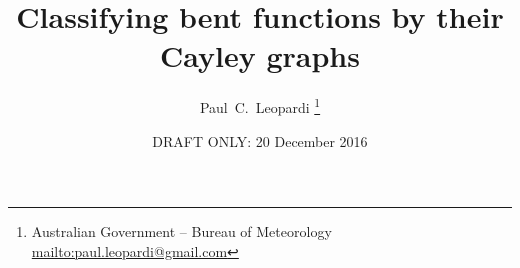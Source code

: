 \documentclass[12pt,a4paper]{article}
\title{Classifying bent functions by their Cayley graphs}
\author{
Paul~C.~Leopardi
\thanks{Australian Government -- Bureau of Meteorology
\protect\url{mailto:paul.leopardi@gmail.com}}
}
\date{DRAFT ONLY: 20 December 2016}
\newcommand{\mb}[1]{\mathbb{#1}}
\newcommand{\Z}{\mb{Z}}
\newtheorem{Theorem}{Theorem}
\begin{document}
\maketitle

\begin{abstract}
%
%
\end{abstract}

% 
% 
% 
\end{document}
